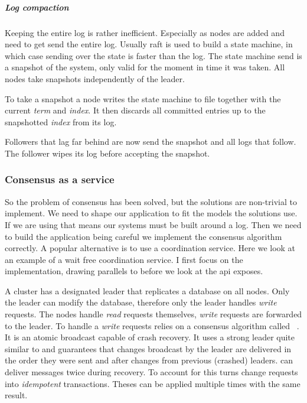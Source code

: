 \subparagraph{Log compaction} \label{par:logcomp}
Keeping the entire log is rather inefficient. Especially as nodes are added and need to get send the entire log. Usually raft is used to build a state machine, in which case sending over the state is faster than the log. The state machine send is a snapshot of the system, only valid for the moment in time it was taken. All nodes take snapshots independently of the leader. 

To take a snapshot a node writes the state machine to file together with the current \textit{term} and \textit{index}. It then discards all committed entries up to the snapshotted \textit{index} from its log. 

Followers that lag far behind are now send the snapshot and all logs that follow. The follower wipes its log before accepting the snapshot.

\subsubsection*{Consensus as a service}
So the problem of consensus has been solved, but the solutions are non-trivial to implement. We need to shape our application to fit the models the solutions use. If we are using \raft{} that means our systems must be built around a log. Then we need to build the application being careful we implement the consensus algorithm correctly. A popular alternative is to use a coordination service. Here we look at \zookeeper{}~\cite{zookeeper} an example of a wait free coordination service. I first focus on the implementation, drawing parallels to \raft{} before we look at the \ac{api} \zookeeper{} exposes.

A \zookeeper{} cluster has a designated leader that replicates a database on all nodes. Only the leader can modify the database, therefore only the leader handles \textit{write} requests. The nodes handle \textit{read} requests themselves, \textit{write} requests are forwarded to the leader. To handle a \textit{write} requests \zookeeper{} relies on a consensus algorithm called \zab{}~\cite{zab}. It is an atomic broadcast capable of crash recovery. It uses a strong leader quite similar to \raft{} and guarantees that changes broadcast by the leader are delivered in the order they were sent and after changes from previous (crashed) leaders. \zab{} can deliver messages twice during recovery. To account for this \zookeeper{} turns change requests into \textit{idempotent} transactions. Theses can be applied multiple times with the same result.

